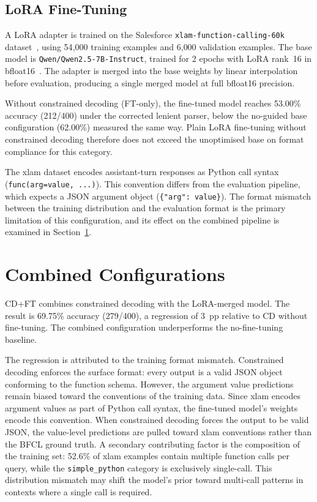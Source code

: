 \subsection{LoRA Fine-Tuning}

A LoRA adapter is trained on the Salesforce \texttt{xlam-function-calling-60k}
dataset~\cite{zhang2024xlam}, using 54{,}000 training examples and 6{,}000
validation examples. The
base model is \texttt{Qwen/Qwen2.5-7B-Instruct}, trained for 2 epochs with
LoRA rank~16 in bfloat16~\cite{hu2022lora}. The adapter is merged into the
base weights by linear interpolation before evaluation, producing a single
merged model at full bfloat16 precision.

Without constrained decoding (FT-only), the fine-tuned model reaches
53.00\% accuracy (212/400) under the corrected lenient parser, below the
no-guided base configuration (62.00\%) measured the same way. Plain LoRA
fine-tuning without constrained decoding therefore does not exceed the
unoptimised base on format compliance for this category.

The xlam dataset encodes assistant-turn responses as Python call syntax
(\texttt{func(arg=value, ...)}). This convention differs from the
evaluation pipeline, which expects a JSON argument object
(\texttt{\{"arg": value\}}). The format mismatch between the training
distribution and the evaluation format is the primary limitation of this
configuration, and its effect on the combined pipeline is examined in
Section~\ref{sec:combined-configs}.

\section{Combined Configurations}
\label{sec:combined-configs}

CD+FT combines constrained decoding with the LoRA-merged model. The
result is 69.75\% accuracy (279/400), a regression of 3~pp relative to
CD without fine-tuning. The combined configuration underperforms the
no-fine-tuning baseline.

The regression is attributed to the training format mismatch. Constrained
decoding enforces the surface format: every output is a valid JSON object
conforming to the function schema. However, the argument value predictions
remain biased toward the conventions of the training data. Since xlam encodes
argument values as part of Python call syntax, the fine-tuned model's weights
encode this convention. When constrained decoding forces the output to be valid
JSON, the value-level predictions are pulled toward xlam conventions rather than
the BFCL ground truth. A secondary contributing factor is the composition of
the training set: 52.6\% of xlam examples contain multiple function calls per
query, while the \texttt{simple\_python} category is exclusively single-call.
This distribution mismatch may shift the model's prior toward multi-call
patterns in contexts where a single call is required.

